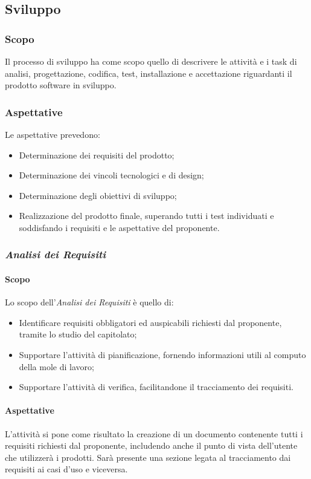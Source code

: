 \documentclass[a4paper, 12pt]{article}
\begin{document}
\subsection{Sviluppo}
\subsubsection{Scopo}
Il processo di sviluppo ha come scopo quello di descrivere le attività e i task di
analisi, progettazione, codifica, test, installazione e accettazione riguardanti
il prodotto software in sviluppo.

\subsubsection{Aspettative}
Le aspettative prevedono:
\begin{itemize}
    \item Determinazione dei requisiti del prodotto;
    \item Determinazione dei vincoli tecnologici e di design;
    \item Determinazione degli obiettivi di sviluppo;
    \item Realizzazione del prodotto finale, superando tutti i test individuati
    e soddisfando i requisiti e le aspettative del proponente.
\end{itemize}

\subsubsection{\textit{Analisi dei Requisiti}}

\paragraph{Scopo}
Lo scopo dell'\textit{Analisi dei Requisiti} è quello di:
\begin{itemize}
    \item Identificare requisiti obbligatori ed auspicabili richiesti dal
    proponente, tramite lo studio del capitolato;
    \item Supportare l'attività di pianificazione, fornendo informazioni utili
    al computo della mole di lavoro;
    \item Supportare l'attività di verifica, facilitandone il tracciamento dei requisiti.
\end{itemize}

\paragraph{Aspettative}
L'attività si pone come risultato la creazione di un documento contenente tutti
i requisiti richiesti dal proponente, includendo anche il punto di vista
dell'utente che utilizzerà i prodotti. Sarà presente una sezione legata al
tracciamento dai requisiti ai casi d'uso e viceversa.
\end{document}
